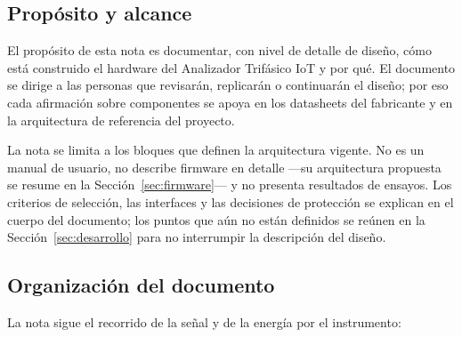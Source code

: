 \documentclass[11pt,a4paper]{article}
\begin{document}
\subsection{Propósito y alcance}

El propósito de esta nota es documentar, con nivel de detalle de diseño, cómo
está construido el hardware del Analizador Trifásico IoT y por qué. El
documento se dirige a las personas que revisarán, replicarán o continuarán el
diseño; por eso cada afirmación sobre componentes se apoya en los datasheets
del fabricante y en la arquitectura de referencia del proyecto.

La nota se limita a los bloques que definen la arquitectura vigente. No es un
manual de usuario, no describe firmware en detalle —su arquitectura propuesta se
resume en la Sección~\ref{sec:firmware}— y no presenta resultados de ensayos.
Los criterios de selección, las interfaces y las decisiones de protección se
explican en el cuerpo del documento; los puntos que aún no están definidos se
reúnen en la Sección~\ref{sec:desarrollo} para no interrumpir la descripción
del diseño.

\subsection{Organización del documento}

La nota sigue el recorrido de la señal y de la energía por el instrumento:
\end{document}
